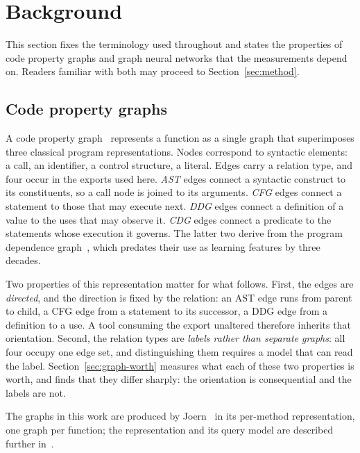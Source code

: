 \section{Background}
\label{sec:background}

This section fixes the terminology used throughout and states the properties of
code property graphs and graph neural networks that the measurements depend on.
Readers familiar with both may proceed to Section~\ref{sec:method}.

\subsection{Code property graphs}
A code property graph~\citep{6956589} represents a function as a single graph
that superimposes three classical program representations. Nodes correspond to
syntactic elements: a call, an identifier, a control structure, a literal. Edges
carry a relation type, and four occur in the exports used here. \emph{AST} edges
connect a syntactic construct to its constituents, so a call node is joined to
its arguments. \emph{CFG} edges connect a statement to those that may execute
next. \emph{DDG} edges connect a definition of a value to the uses that may
observe it. \emph{CDG} edges connect a predicate to the statements whose
execution it governs. The latter two derive from the program dependence
graph~\citep{10.1145/24039.24041}, which predates their use as learning
features by three decades.

Two properties of this representation matter for what follows. First, the edges
are \emph{directed}, and the direction is fixed by the relation: an AST edge runs
from parent to child, a CFG edge from a statement to its successor, a DDG edge
from a definition to a use. A tool consuming the export unaltered therefore
inherits that orientation. Second, the relation types are \emph{labels rather
than separate graphs}: all four occupy one edge set, and distinguishing them
requires a model that can read the label. Section~\ref{sec:graph-worth} measures
what each of these two properties is worth, and finds that they differ sharply:
the orientation is consequential and the labels are not.

The graphs in this work are produced by Joern~\citep{joern_cpg_docs} in its
per-method representation, one graph per function; the representation and its
query model are described further
in~\citep{yamaguchi2020_querying_whole_program_graphs}.

